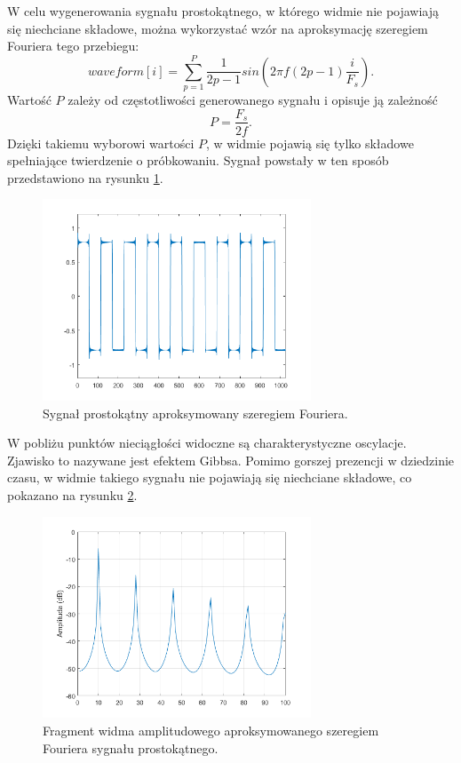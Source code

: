 W celu wygenerowania sygnału prostokątnego, w którego widmie nie pojawiają się niechciane składowe, można wykorzystać wzór na aproksymację szeregiem Fouriera tego przebiegu:
\begin{equation} \label{equ:sub_gibbs}
waveform[i] = \sum_{p=1}^{P}\frac{1}{2p-1}sin(2\pi f(2p-1)  \frac{i}{F_s}).
\end{equation}
Wartość $P$ zależy od częstotliwości generowanego sygnału i opisuje ją zależność 
\begin{equation} \label{equ:sub_gibbs2}
P = \frac{F_s}{2f}.
\end{equation}
Dzięki takiemu wyborowi wartości $P$, w widmie pojawią się tylko składowe spełniające twierdzenie o próbkowaniu. Sygnał powstały w ten sposób przedstawiono na rysunku \ref{rys:sub_gibbs2}.
 \begin{figure}[H]
 	\centering
 	\includegraphics[width=8cm]{grafiki/sub_gibbs2}
 	\captionsetup{justification=centering}
 	\caption{Sygnał prostokątny aproksymowany szeregiem Fouriera.}
 	\label{rys:sub_gibbs2}
 \end{figure}

W pobliżu punktów nieciągłości widoczne są charakterystyczne oscylacje. Zjawisko to nazywane jest efektem Gibbsa. Pomimo gorszej prezencji w dziedzinie czasu, w widmie takiego sygnału nie pojawiają się niechciane składowe, co pokazano na rysunku \ref{rys:sub_gibbs3}.
\begin{figure}[H]
	\centering
	\includegraphics[width=8cm]{grafiki/sub_gibbs3}
	\captionsetup{justification=centering}
	\caption{Fragment widma amplitudowego aproksymowanego szeregiem Fouriera sygnału prostokątnego.}
	\label{rys:sub_gibbs3}
\end{figure}

